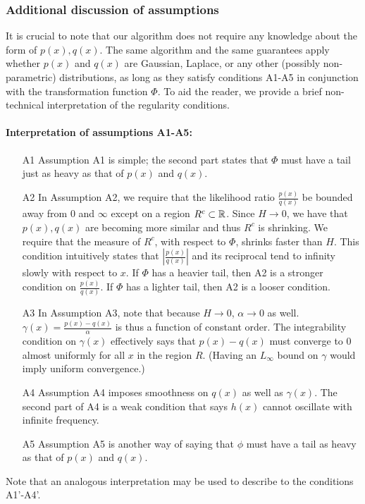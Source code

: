 \documentclass{article}
\begin{document}
\subsubsection{Additional discussion of assumptions}

It is crucial to note that our algorithm does not require any knowledge about the form of $p(x), q(x)$. The same algorithm and the same guarantees apply whether $p(x)$ and $q(x)$ are Gaussian, Laplace, or any other (possibly non-parametric) distributions, as long as they satisfy conditions A1-A5 in conjunction with the transformation function $\Phi$. To aid the reader, we provide a brief non-technical interpretation of the regularity conditions.

\paragraph{\textbf{Interpretation of assumptions A1-A5:}}

\begin{enumerate}
\item[A1] Assumption A1 is simple; the second part states that $\Phi$ must have a tail just as heavy as that of $p(x)$ and $q(x)$. 
\item[A2] In Assumption A2, we require that the likelihood ratio $\frac{p(x)}{q(x)}$ be bounded away from 0 and $\infty$ except on a region $ R^c \subset {\mathbb R}$. Since $H \rightarrow 0$, we have that $p(x), q(x)$ are becoming more similar and thus $R^c$ is shrinking. We require that the measure of $R^c$, with respect to $\Phi$, shrinks faster than $H$. This condition intuitively states that $|\frac{p(x)}{q(x)}|$ and its reciprocal tend to infinity slowly with respect to $x$. If $\Phi$ has a heavier tail, then A2 is a stronger condition on $\frac{p(x)}{q(x)}$. If $\Phi$ has a lighter tail, then A2 is a looser condition.
\item[A3] In Assumption A3, note that because $H \rightarrow 0$, $\alpha \rightarrow 0$ as well. $\gamma(x) = \frac{p(x) - q(x)}{\alpha}$ is thus a function of constant order. The integrability condition on $\gamma(x)$ effectively says that $p(x) - q(x)$ must converge to 0 almost uniformly for all $x$ in the region $R$. (Having an $L_\infty$ bound on $\gamma$ would imply uniform convergence.) 
\item[A4]  Assumption A4 imposes smoothness on $q(x)$ as well as $\gamma(x)$. The second part of A4 is a weak condition that says $h(x)$ cannot oscillate with infinite frequency. 
\item[A5] Assumption A5 is another way of saying that $\phi$ must have a tail as heavy as that of $p(x)$ and $q(x)$. 
\end{enumerate}
Note that an analogous interpretation may be used to describe to the conditions A1'-A4'.
\end{document}
